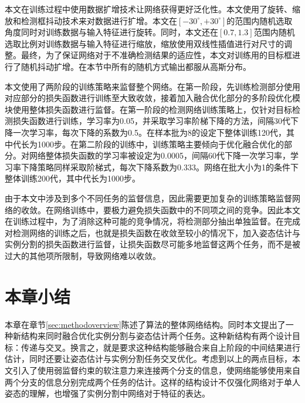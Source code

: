 本文在训练过程中使用数据扩增技术让网络获得更好泛化性。本文使用了旋转、缩放和检测框抖动技术来对数据进行扩增。本文在$[-30^\circ, +30^\circ]$的范围内随机选取角度同时对训练数据与输入特征进行旋转。同时，本文还在$[0.7, 1.3]$范围内随机选取比例对训练数据与输入特征进行缩放，缩放使用双线性插值进行对尺寸的调整。最终，为了保证网络对于不准确检测结果的适应性，本文对训练用的目标框进行了随机抖动扩增。在本节中所有的随机方式输出都服从高斯分布。

本文使用了两阶段的训练策略来监督整个网络。在第一阶段，先训练检测部分使用对应部分的损失函数进行训练至大致收敛，接着加入融合优化部分的多阶段优化模块使用整体损失函数进行监督。在第一阶段的检测网络训练策略上，仅针对目标检测损失函数进行训练，学习率为0.05，并采取学习率阶梯下降的方法，间隔30代下降一次学习率，每次下降的系数为0.5。在样本批为8的设定下整体训练120代，其中代长为1000步。在第二阶段的训练中，训练策略主要倾向于优化融合优化的部分。对网络整体损失函数的学习率被设定为0.0005，间隔60代下降一次学习率，学习率下降策略同样采取阶梯式，每次下降系数为0.333。网络在批大小为1的条件下整体训练200代，其中代长为1000步。

由于本文中涉及到多个不同任务的监督信息，因此需要更加复杂的训练策略监督网络的收敛。在网络训练中，要极力避免损失函数中的不同项之间的竞争。因此本文在训练过程中，为了消除这种可能的竞争情况，将检测部分抽出单独监督。在完成对检测网络的训练之后，也就是损失函数在收敛至较小的情况下，加入姿态估计与实例分割的损失函数进行监督，让损失函数尽可能多地监督这两个任务，而不是被过大的其他项所限制，导致网络难以收敛。

\section{本章小结}
本章在章节\ref{sec:methodoverview}陈述了算法的整体网络结构。同时本文提出了一种新结构来同时融合优化实例分割与姿态估计两个任务。这种新结构有两个设计目标：传递与交叉。换言之，就是要求这种结构能够融合来自上阶段的中间结果进行估计，同时还要让姿态估计与实例分割任务交叉优化。考虑到以上的两点目标，本文引入了使用弱监督约束的软注意力来连接两个分支的信息，使网络能够使用来自两个分支的信息分别完成两个任务的估计。这样的结构设计不仅强化网络对于单人姿态的理解，也增强了实例分割中网络对于特征的表达。
